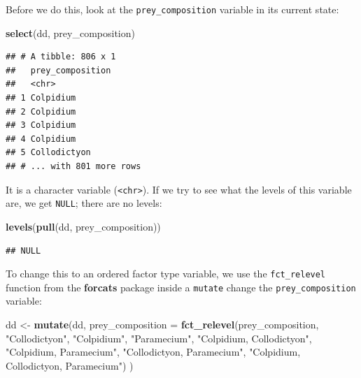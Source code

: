 \documentclass[]{book}
\newenvironment{Shaded}{\begin{snugshade}}{\end{snugshade}}
\newcommand{\DataTypeTok}[1]{\textcolor[rgb]{0.13,0.29,0.53}{#1}}
\newcommand{\KeywordTok}[1]{\textcolor[rgb]{0.13,0.29,0.53}{\textbf{#1}}}
\newcommand{\NormalTok}[1]{#1}
\newcommand{\StringTok}[1]{\textcolor[rgb]{0.31,0.60,0.02}{#1}}
\begin{document}
Before we do this, look at the \texttt{prey\_composition} variable in its current state:

\begin{Shaded}
\begin{Highlighting}[]
\KeywordTok{select}\NormalTok{(dd, prey_composition)}
\end{Highlighting}
\end{Shaded}

\begin{verbatim}
## # A tibble: 806 x 1
##   prey_composition
##   <chr>           
## 1 Colpidium       
## 2 Colpidium       
## 3 Colpidium       
## 4 Colpidium       
## 5 Collodictyon    
## # ... with 801 more rows
\end{verbatim}

It is a character variable (\texttt{\textless{}chr\textgreater{}}). If we try to see what the levels of this variable are, we get \texttt{NULL}; there are no levels:

\begin{Shaded}
\begin{Highlighting}[]
\KeywordTok{levels}\NormalTok{(}\KeywordTok{pull}\NormalTok{(dd, prey_composition))}
\end{Highlighting}
\end{Shaded}

\begin{verbatim}
## NULL
\end{verbatim}

To change this to an ordered factor type variable, we use the \texttt{fct\_relevel} function from the \textbf{forcats} package inside a \texttt{mutate} change the \texttt{prey\_composition} variable:

\begin{Shaded}
\begin{Highlighting}[]
\NormalTok{dd <-}\StringTok{ }\KeywordTok{mutate}\NormalTok{(dd,}
             \DataTypeTok{prey_composition =} \KeywordTok{fct_relevel}\NormalTok{(prey_composition,}
                                            \StringTok{"Collodictyon"}\NormalTok{,}
                                            \StringTok{"Colpidium"}\NormalTok{,}
                                            \StringTok{"Paramecium"}\NormalTok{,}
                                            \StringTok{"Colpidium, Collodictyon"}\NormalTok{,}
                                            \StringTok{"Colpidium, Paramecium"}\NormalTok{,}
                                            \StringTok{"Collodictyon, Paramecium"}\NormalTok{,}
                                            \StringTok{"Colpidium, Collodictyon, Paramecium"}\NormalTok{)}
\NormalTok{                                            )}
\end{Highlighting}
\end{Shaded}
\end{document}
